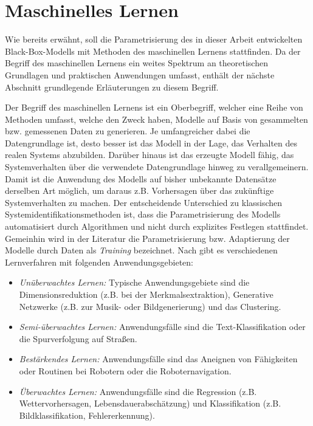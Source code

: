 \section{Maschinelles Lernen}
\label{cha:machine_learning}

Wie bereits erwähnt, soll die Parametrisierung des in dieser Arbeit entwickelten Black-Box-Modells mit Methoden des maschinellen Lernens stattfinden. Da der Begriff des maschinellen Lernens ein weites Spektrum an theoretischen Grundlagen und praktischen Anwendungen umfasst, enthält der nächste Abschnitt grundlegende Erläuterungen zu diesem Begriff.

Der Begriff des maschinellen Lernens ist ein Oberbegriff, welcher eine Reihe von Methoden umfasst, welche den Zweck haben, Modelle auf Basis von gesammelten bzw. gemessenen Daten zu generieren. Je umfangreicher dabei die Datengrundlage ist, desto besser ist das Modell in der Lage, das Verhalten des realen Systems abzubilden.  Darüber hinaus ist das erzeugte Modell fähig, das Systemverhalten über die verwendete Datengrundlage hinweg zu verallgemeinern. Damit ist die Anwendung des Modells auf bisher unbekannte Datensätze derselben Art möglich, um daraus z.B. Vorhersagen über das zukünftige Systemverhalten zu machen.  Der entscheidende Unterschied zu klassischen Systemidentifikationsmethoden ist, dass die Parametrisierung des Modells automatisiert durch Algorithmen und nicht durch explizites Festlegen stattfindet. \cite{Duriez.2017} \\

Gemeinhin wird in der Literatur die Parametrisierung bzw. Adaptierung der Modelle durch Daten als \textit{Training} bezeichnet. Nach \cite{Dobel.2018} gibt es verschiedenen Lernverfahren mit folgenden Anwendungsgebieten:

\begin{itemize}
	\item \textit{Unüberwachtes Lernen:} Typische Anwendungsgebiete sind die Dimensionsreduktion (z.B. bei der Merkmalsextraktion), Generative Netzwerke (z.B. zur Musik- oder Bildgenerierung) und das Clustering.
	\item \textit{Semi-überwachtes Lernen:} Anwendungsfälle sind die Text-Klassifikation oder die Spurverfolgung auf Straßen.
	\item \textit{Bestärkendes Lernen:} Anwendungsfälle sind das Aneignen von Fähigkeiten oder Routinen bei Robotern oder die Roboternavigation.
	\item \textit{Überwachtes Lernen:} Anwendungsfälle sind die Regression (z.B. Wettervorhersagen, Lebensdauerabschätzung) und Klassifikation (z.B. Bildklassifikation, Fehlererkennung). \cite{Dobel.2018}
\end{itemize} 

